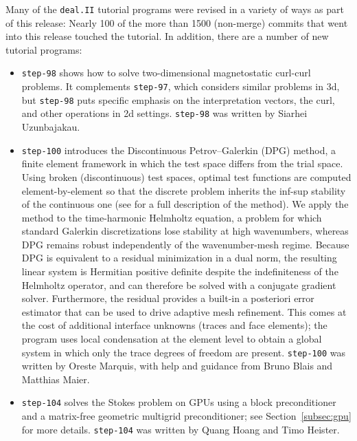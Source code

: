 \documentclass{ansarticle-preprint}
\newcommand{\specialword}[1]{\texttt{#1}}
\newcommand{\dealii}{{\specialword{deal.II}}\xspace}
\newcommand{\step}[1]{{\specialword{step-#1}}\xspace}
\begin{document}
Many of the \dealii tutorial programs were revised in a variety of ways
as part of this release: Nearly 100 of the more than 1500 (non-merge)
commits that went into this release touched the tutorial.
In addition, there are a number of new tutorial
programs:
\begin{itemize}
\item
  \step{98} shows how to solve two-dimensional magnetostatic curl-curl
  problems. It complements \step{97}, which considers similar problems
  in 3d, but \step{98} puts specific emphasis on the interpretation
  vectors, the curl, and other operations in 2d settings.
    \step{98} was written by Siarhei Uzunbajakau.
  \item \step{100} introduces the Discontinuous Petrov–Galerkin (DPG) method,
a finite element framework in which the test space differs from the trial space.
Using broken (discontinuous) test spaces, optimal test functions are computed element-by-element
so that the discrete problem inherits the inf-sup stability of the continuous one
(see \cite{Demkowicz2010,Demkowicz2011,Demkowicz2012} for a full description of the method).
We apply the method to the time-harmonic Helmholtz equation, a problem for which standard Galerkin
discretizations lose stability at high wavenumbers, whereas DPG remains robust
independently of the wavenumber-mesh regime. Because DPG is equivalent to a residual minimization in a dual norm,
the resulting linear system is Hermitian positive definite despite the indefiniteness of the Helmholtz operator,
and can therefore be solved with a conjugate gradient solver. Furthermore, the residual provides a built-in
a posteriori error estimator that can be used to drive adaptive mesh refinement. This comes at the cost of additional
interface unknowns (traces and face elements); the program uses local condensation at the element level to obtain a global
system in which only the trace degrees of freedom are present.
    \step{100} was written by Oreste Marquis, with help and guidance from Bruno Blais and Matthias Maier.
  \item \step{104} solves the Stokes problem on GPUs using a block
    preconditioner and a matrix-free geometric multigrid
    preconditioner; see Section~\ref{subsec:gpu} for more details.
    \step{104} was written by Quang Hoang and Timo Heister.
\end{itemize}
\end{document}
